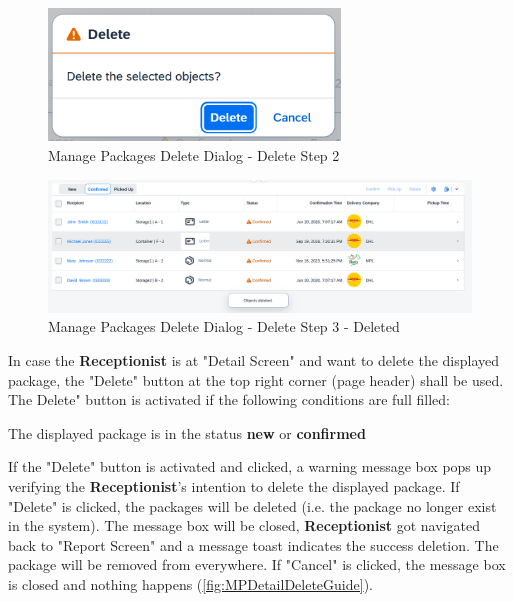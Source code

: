 \begin{figure}[H]
	\centering
	\includegraphics[height=100pt]{images/user_doc/managePack/ReportScreen/delete/deleteDlalog.png}
	\caption{Manage Packages Delete Dialog - Delete Step 2}
	\label{fig:MPReportDeleteDlg}
\end{figure}

\begin{figure}[H]
	\centering
	\includegraphics[height=100pt]{images/user_doc/managePack/ReportScreen/delete/deleteToast.png}
	\caption{Manage Packages Delete Dialog - Delete Step 3 - Deleted}
	\label{fig:MPReportDeleteDone}
\end{figure}


\bigskip
In case the \textbf{Receptionist} is at "Detail Screen" and want to delete the displayed package, the "Delete" button at the top right corner (page header) shall be used. 
The Delete" button is activated if the following conditions are full filled:

\begin{compactenum}
    \item The displayed package is in the status \textbf{new} or \textbf{confirmed}
\end{compactenum}

\bigskip
If the "Delete" button is activated and clicked, a warning message box pops up verifying the \textbf{Receptionist}'s intention to delete the displayed package. If "Delete" is clicked, the packages will be deleted (i.e. the package no longer exist in the system). The message box will be closed, \textbf{Receptionist} got navigated back to "Report Screen" and a message toast indicates the success deletion. The package will be removed from everywhere. If "Cancel" is clicked, the message box is closed and nothing happens (\autoref{fig:MPDetailDeleteGuide}).

